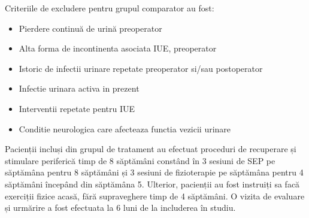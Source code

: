 \documentclass[12pt,draft]{article}
\begin{document}
  Criteriile de excludere pentru grupul comparator au fost:
  \begin{itemize}
    \item Pierdere continuă de urină preoperator
    \item Alta forma de incontinenta asociata IUE, preoperator
    \item Istoric de infectii urinare repetate preoperator si/sau postoperator
    \item Infectie urinara activa in prezent
    \item Interventii repetate pentru IUE
    \item Conditie neurologica care afecteaza functia vezicii urinare
 \end{itemize}
   
  Pacienții incluși din grupul de tratament au efectuat proceduri de recuperare și stimulare periferică timp de 8 săptămâni constând în 3 sesiuni de \ac{SEP} pe săptămâna pentru 8 săptămâni și 3 sesiuni de fizioterapie pe săptămâna pentru 4 săptămâni începând din săptămâna 5. Ulterior, pacienții au fost instruiți sa facă exerciții fizice acasă, fără supraveghere timp de 4 săptămâni. O vizita de evaluare și urmărire a fost efectuata la 6 luni de la includerea în studiu.
  
\end{document}
